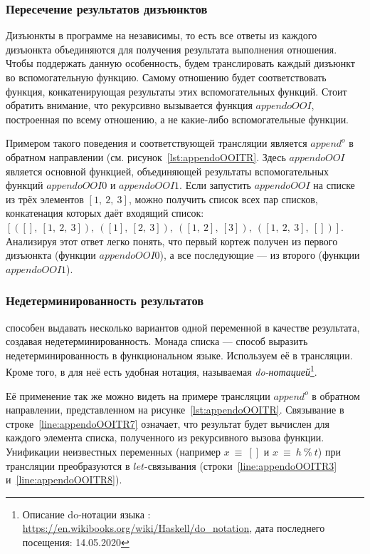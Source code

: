 \subsubsection{Пересечение результатов дизъюнктов}

Дизъюнкты в программе на \miniKanren{} независимы, то есть все ответы из каждого дизъюнкта объединяются для получения результата выполнения отношения.
Чтобы поддержать данную особенность, будем транслировать каждый дизъюнкт во вспомогательную функцию.
Самому отношению будет соответствовать функция, конкатенирующая результаты этих вспомогательных функций.
Стоит обратить внимание, что рекурсивно вызывается функция $appendoOOI$, построенная по всему отношению, а не какие-либо вспомогательные функции.

Примером такого поведения и соответствующей трансляции является $append^o$ в обратном направлении (см. рисунок~\ref{lst:appendoOOITR}.
Здесь $appendoOOI$ является основной функцией, объединяющей результаты вспомогательных функций $appendoOOI0$ и $appendoOOI1$.
Если запустить $appendoOOI$ на списке из трёх элементов $[1,~2,~3]$, можно получить список всех пар списков, конкатенация которых даёт входящий список: \\ $[([],~[1,~2,~3]),~([1],~[2,~3]),~([1,~2],~[3]),~([1,~2,~3],~[])]$.
Анализируя этот ответ легко понять, что первый кортеж получен из первого дизъюнкта (функции $appendoOOI0$), а все последующие --- из второго (функции $appendoOOI1$).


\subsubsection{Недетерминированность результатов}

\miniKanren{} способен выдавать несколько вариантов одной переменной в качестве результата, создавая недетерминированность.
Монада списка --- способ выразить недетерминированность в функциональном языке.
Используем её в трансляции.
Кроме того, в \haskell{} для неё есть удобная нотация, называемая \emph{do-нотацией}\footnote{Описание do-нотации языка \haskell{}: \url{https://en.wikibooks.org/wiki/Haskell/do\_notation}, дата последнего посещения: 14.05.2020}.

Её применение так же можно видеть на примере трансляции $append^o$ в обратном направлении, представленном на рисунке~\ref{lst:appendoOOITR}.
Связывание в строке~\ref{line:appendoOOITR7} означает, что результат будет вычислен для каждого элемента списка, полученного из рекурсивного вызова функции.
Унификации неизвестных переменных (например $x~\equiv~[]$ и $x~\equiv~h~\%~t$) при трансляции преобразуются в $let$-связывания (строки~\ref{line:appendoOOITR3} и~\ref{line:appendoOOITR8}). 

